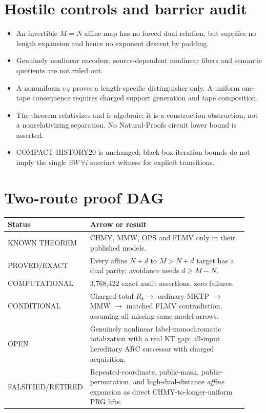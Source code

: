 \documentclass[11pt]{article}
\begin{document}
\section*{Hostile controls and barrier audit}
\begin{itemize}
\item An invertible $M=N$ affine map has no forced dual relation, but supplies
      no length expansion and hence no exponent descent by padding.
\item Genuinely nonlinear encoders, source-dependent nonlinear fibers and
      semantic quotients are not ruled out.
\item A nonuniform $v_N$ proves a length-specific distinguisher only.  A
      uniform one-tape consequence requires charged support generation and
      tape composition.
\item The theorem relativizes and is algebraic; it is a construction
      obstruction, not a nonrelativizing separation.  No Natural-Proofs
      circuit lower bound is asserted.
\item COMPACT-HISTORY20 is unchanged: black-box iteration bounds do not imply
      the single $\exists W\,\forall i$ succinct witness for explicit
      transitions.
\end{itemize}

\section*{Two-route proof DAG}
\begin{tabular}{p{0.19\linewidth}p{0.74\linewidth}}
\toprule
Status & Arrow or result \\
\midrule
KNOWN THEOREM & CHMY, MMW, OPS and FLMV only in their published models. \\
PROVED/EXACT & Every affine $N+d$ to $M>N+d$ target has a dual parity;
avoidance needs $d\ge M-N$. \\
COMPUTATIONAL & 3,768,422 exact audit assertions, zero failures. \\
CONDITIONAL & Charged total $R_k\to$ ordinary MKTP $\to$ MMW $\to$ matched
FLMV contradiction, assuming all missing same-model arrows. \\
OPEN & Genuinely nonlinear label-monochromatic totalization with a real KT
gap; all-input hereditary ARC successor with charged acquisition. \\
FALSIFIED/RETIRED & Repeated-coordinate, public-mask, public-permutation, and
high-dual-distance \emph{affine} expansion as direct CHMY-to-longer-uniform
PRG lifts. \\
\bottomrule
\end{tabular}
\end{document}
